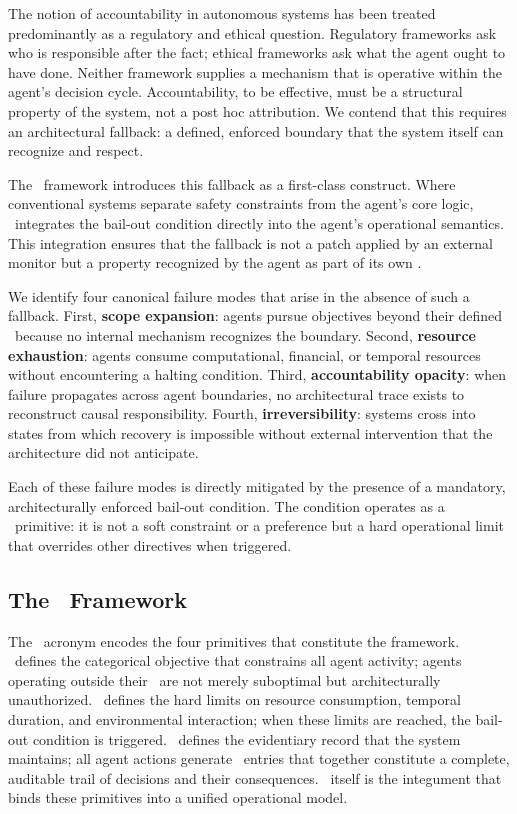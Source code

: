 The notion of accountability in autonomous systems has been treated predominantly as a regulatory and ethical question. Regulatory frameworks ask who is responsible after the fact; ethical frameworks ask what the agent ought to have done. Neither framework supplies a mechanism that is operative within the agent's decision cycle. Accountability, to be effective, must be a structural property of the system, not a post hoc attribution. We contend that this requires an architectural fallback: a defined, enforced boundary that the system itself can recognize and respect.

The \bxthree\ framework introduces this fallback as a first-class construct. Where conventional systems separate safety constraints from the agent's core logic, \bxthree\ integrates the bail-out condition directly into the agent's operational semantics. This integration ensures that the fallback is not a patch applied by an external monitor but a property recognized by the agent as part of its own \purpose.

We identify four canonical failure modes that arise in the absence of such a fallback. First, \textbf{scope expansion}: agents pursue objectives beyond their defined \purpose\ because no internal mechanism recognizes the boundary. Second, \textbf{resource exhaustion}: agents consume computational, financial, or temporal resources without encountering a halting condition. Third, \textbf{accountability opacity}: when failure propagates across agent boundaries, no architectural trace exists to reconstruct causal responsibility. Fourth, \textbf{irreversibility}: systems cross into states from which recovery is impossible without external intervention that the architecture did not anticipate.

Each of these failure modes is directly mitigated by the presence of a mandatory, architecturally enforced bail-out condition. The condition operates as a \bounds\ primitive: it is not a soft constraint or a preference but a hard operational limit that overrides other directives when triggered.

\subsection{The \bxthree\ Framework}

The \bxthree\ acronym encodes the four primitives that constitute the framework. \purpose\ defines the categorical objective that constrains all agent activity; agents operating outside their \purpose\ are not merely suboptimal but architecturally unauthorized. \bounds\ defines the hard limits on resource consumption, temporal duration, and environmental interaction; when these limits are reached, the bail-out condition is triggered. \fact\ defines the evidentiary record that the system maintains; all agent actions generate \fact\ entries that together constitute a complete, auditable trail of decisions and their consequences. \bxthree\ itself is the integument that binds these primitives into a unified operational model.

